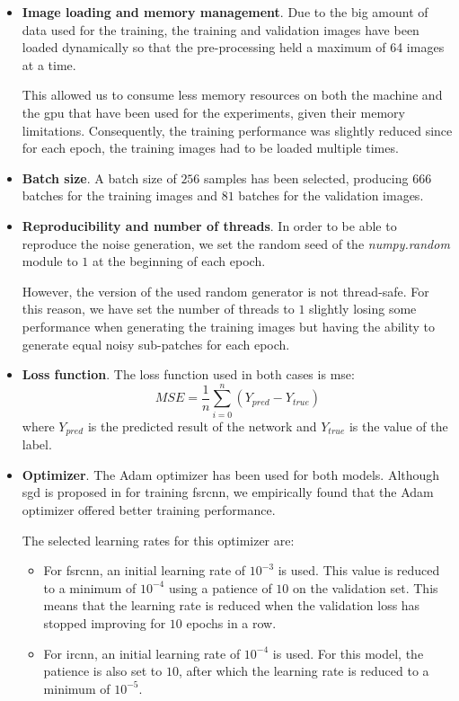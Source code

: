 \begin{itemize}
	\item \textbf{Image loading and memory management}. Due to the big amount of data used for the training, the training and validation images have been loaded dynamically so that the pre-processing held a maximum of 64 images at a time. 
	
	This allowed us to consume less memory resources on both the machine and the \gls{gpu} that have been used for the experiments, given their memory limitations. Consequently, the training performance was slightly reduced since for each epoch, the training images had to be loaded multiple times.
	
	\item \textbf{Batch size}. A batch size of $256$ samples has been selected, producing $666$ batches for the training images and $81$ batches for the validation images.
	
	\item \textbf{Reproducibility and number of threads}. In order to be able to reproduce the noise generation, we set the random seed of the \textit{numpy.random} module to $1$ at the beginning of each epoch. 
	
	However, the version of the used random generator is not thread-safe. For this reason, we have set the number of threads to $1$ slightly losing some performance when generating the training images but having the ability to generate equal noisy sub-patches for each epoch.
	
	\item \textbf{Loss function}. The loss function used in both cases is \gls{mse}:
	$$MSE = \frac{1}{n}\sum_{i=0}^{n}\left(Y_{pred}-Y_{true}\right)$$
	where $Y_{pred}$ is the predicted result of the network and $Y_{true}$ is the value of the label.
	\item \textbf{Optimizer}. The Adam optimizer \cite{ADAM} has been used for both models. Although \gls{sgd} is proposed in \cite{FSRCNN} for training \gls{fsrcnn}, we empirically found that the Adam optimizer offered better training performance.
	
	The selected learning rates for this optimizer are:
	\begin{itemize}
		\item For \gls{fsrcnn}, an initial learning rate of $10^{-3}$ is used. This value is reduced to a minimum of $10^{-4}$ using a patience of $10$ on the validation set. This means that the learning rate is reduced when the validation loss has stopped improving for $10$ epochs in a row.
		\item For \gls{ircnn}, an initial learning rate of $10^{-4}$ is used. For this model, the patience is also set to $10$, after which the learning rate is reduced to a minimum of $10^{-5}$. 
		

\end{itemize}
\end{itemize}
